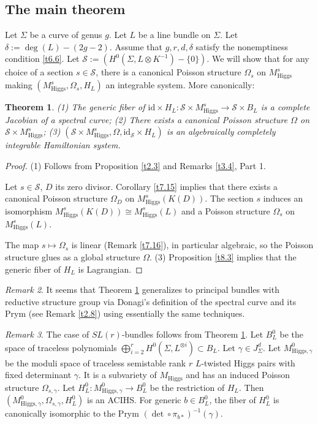 \documentclass[12pt,a4paper,oneside,english]{smfart}
\newtheorem{thm}{Theorem}[section]
\theoremstyle{definition}
\theoremstyle{remark}
\newtheorem{rem}[thm]{Remark}
\newcommand{\Hig}{\mathrm{Higgs}}
\newcommand{\MH}{M_{\Hig}}
\newcommand{\MHs}{M^{s}_{\Hig}}
\newcommand{\cS}{\mathcal{S}}
\begin{document}
\subsection{The main theorem}\label{sec:8.2}

Let $\Sigma$ be a curve of genus $g$. Let $L$ be a line bundle on $\Sigma$. Let $\delta := \deg(L) - (2g - 2)$. Assume that $g, r, d, \delta$ satisfy the nonemptiness condition \ref{t6.6}. Let $\cS := (H^0(\Sigma, L \otimes K^{-1}) - \{0\})$. We will show that for any choice of a section $s \in \cS$, there is a canonical Poisson structure $\Omega_s$ on $\MHs$ making $(\MHs, \Omega_s, H_L)$ an integrable system. More canonically:

\begin{thm}\label{t8.5}
(1) The generic fiber of $\mathrm{id} \times H_L \colon \cS \times \MHs \to \cS \times B_L$ is a complete Jacobian of a spectral curve; (2) There exists a canonical Poisson structure $\Omega$ on $\cS \times \MHs$; (3) $(\cS \times \MHs, \Omega, \mathrm{id}_{\cS} \times H_L)$ is an algebraically completely integrable Hamiltonian system.
\end{thm}

\begin{proof}
(1) Follows from Proposition \ref{t2.3} and Remarks \ref{t3.4}, Part 1.

Let $s \in \cS$, $D$ its zero divisor. Corollary \ref{t7.15} implies that there exists a canonical Poisson structure $\Omega_D$ on $\MHs(K(D))$. The section $s$ induces an isomorphism $\MHs(K(D)) \cong \MHs(L)$ and a Poisson structure $\Omega_s$ on $\MHs(L)$.

The map $s \mapsto \Omega_s$ is linear (Remark \ref{t7.16}), in particular algebraic, so the Poisson structure glues as a global structure $\Omega$. (3) Proposition \ref{t8.3} implies that the generic fiber of $H_L$ is Lagrangian.
\end{proof}

\begin{rem}\label{t8.6}
It seems that Theorem \ref{t8.5} generalizes to principal bundles with reductive structure group via Donagi's definition of the spectral curve and its Prym (see Remark \ref{t2.8}) using essentially the same techniques.
\end{rem}

\begin{rem}\label{t8.7}
The case of $SL(r)$-bundles follows from Theorem \ref{t8.5}. Let $B_L^0$ be the space of traceless polynomials $\bigoplus_{i=2}^{r} H^0(\Sigma, L^{\otimes i}) \subset B_L$. Let $\gamma \in J_\Sigma^d$. Let $M^0_{\Hig, \gamma}$ be the moduli space of traceless semistable rank $r$ $L$-twisted Higgs pairs with fixed determinant $\gamma$. It is a subvariety of $\MH$ and has an induced Poisson structure $\Omega_{s, \gamma}$. Let $H_L^0 \colon M^0_{\Hig, \gamma} \to B_L^0$ be the restriction of $H_L$. Then $(M^0_{\Hig, \gamma}, \Omega_{s, \gamma}, H_L^0)$ is an ACIHS. For generic $b \in B_L^0$, the fiber of $H_L^0$ is canonically isomorphic to the Prym $(\det \circ \pi_{b*})^{-1}(\gamma)$.
\end{rem}
\end{document}
